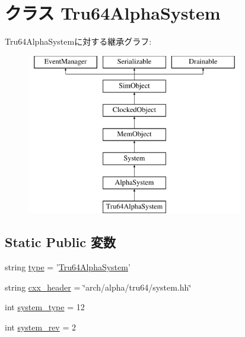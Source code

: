 \hypertarget{classAlphaSystem_1_1Tru64AlphaSystem}{
\section{クラス Tru64AlphaSystem}
\label{classAlphaSystem_1_1Tru64AlphaSystem}
}
Tru64AlphaSystemに対する継承グラフ:\begin{figure}[H]
\begin{center}
\leavevmode
\includegraphics[height=7cm]{classAlphaSystem_1_1Tru64AlphaSystem}
\end{center}
\end{figure}
\subsection*{Static Public 変数}
\begin{DoxyCompactItemize}
\item 
string \hyperlink{classAlphaSystem_1_1Tru64AlphaSystem_acce15679d830831b0bbe8ebc2a60b2ca}{type} = '\hyperlink{classAlphaSystem_1_1Tru64AlphaSystem}{Tru64AlphaSystem}'
\item 
string \hyperlink{classAlphaSystem_1_1Tru64AlphaSystem_a17da7064bc5c518791f0c891eff05fda}{cxx\_\-header} = \char`\"{}arch/alpha/tru64/system.hh\char`\"{}
\item 
int \hyperlink{classAlphaSystem_1_1Tru64AlphaSystem_acfe3506cfe10e05a2cb2c2973dc5dad2}{system\_\-type} = 12
\item 
int \hyperlink{classAlphaSystem_1_1Tru64AlphaSystem_a261e4081ddd1f0823eccc0f042086c27}{system\_\-rev} = 2
\end{DoxyCompactItemize}


